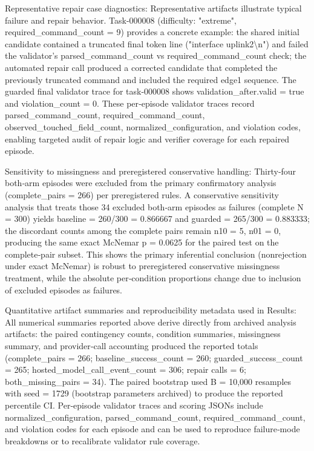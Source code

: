 \documentclass[conference]{IEEEtran}
\begin{document}
Representative repair case diagnostics: Representative artifacts illustrate typical failure and repair behavior. Task-000008 (difficulty: "extreme", required\_command\_count = 9) provides a concrete example: the shared initial candidate contained a truncated final token line ("interface uplink2\textbackslash{}n") and failed the validator's parsed\_command\_count vs required\_command\_count check; the automated repair call produced a corrected candidate that completed the previously truncated command and included the required edge1 sequence. The guarded final validator trace for task-000008 shows validation\_after.valid = true and violation\_count = 0. These per‑episode validator traces record parsed\_command\_count, required\_command\_count, observed\_touched\_field\_count, normalized\_configuration, and violation codes, enabling targeted audit of repair logic and verifier coverage for each repaired episode.

Sensitivity to missingness and preregistered conservative handling: Thirty‑four both‑arm episodes were excluded from the primary confirmatory analysis (complete\_pairs = 266) per preregistered rules. A conservative sensitivity analysis that treats those 34 excluded both‑arm episodes as failures (complete N = 300) yields baseline = 260/300 = 0.866667 and guarded = 265/300 = 0.883333; the discordant counts among the complete pairs remain n10 = 5, n01 = 0, producing the same exact McNemar p = 0.0625 for the paired test on the complete‑pair subset. This shows the primary inferential conclusion (nonrejection under exact McNemar) is robust to preregistered conservative missingness treatment, while the absolute per‑condition proportions change due to inclusion of excluded episodes as failures.

Quantitative artifact summaries and reproducibility metadata used in Results: All numerical summaries reported above derive directly from archived analysis artifacts: the paired contingency counts, condition summaries, missingness summary, and provider‑call accounting produced the reported totals (complete\_pairs = 266; baseline\_success\_count = 260; guarded\_success\_count = 265; hosted\_model\_call\_event\_count = 306; repair calls = 6; both\_missing\_pairs = 34). The paired bootstrap used B = 10,000 resamples with seed = 1729 (bootstrap parameters archived) to produce the reported percentile CI. Per‑episode validator traces and scoring JSONs include normalized\_configuration, parsed\_command\_count, required\_command\_count, and violation codes for each episode and can be used to reproduce failure‑mode breakdowns or to recalibrate validator rule coverage.
\end{document}

